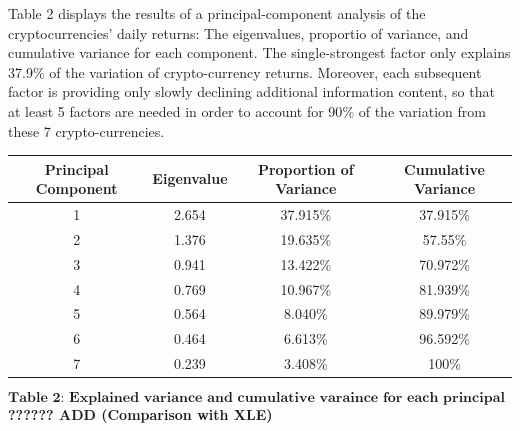\documentclass[12pt,twoside]{article}
\newcommand{\head}[1]{\textnormal{\textbf{#1}}}
\begin{document}
\bigbreak
Table 2 displays the results of a principal-component analysis of the cryptocurrencies’ daily returns: The eigenvalues, proportio of variance, and cumulative variance for each component. The single-strongest factor only explains 37.9$\%$ of the variation of crypto-currency returns. Moreover, each subsequent factor is providing only slowly declining additional information content, so that at least 5 factors are needed in order to account for 90$\%$ of the variation from these 7 crypto-currencies. 
\bigbreak
\begin{tabular}{cccc}
\hline
\head{Principal Component} & \head{Eigenvalue} & \head{Proportion of Variance} & \head{Cumulative Variance}\\
\hline
1 & 2.654 &  37.915\% & 37.915\%\\
2 & 1.376 & 19.635\% & 57.55\%\\
3 & 0.941 &  13.422\% & 70.972\%\\
4 & 0.769 &  10.967\% & 81.939\%\\
5 & 0.564 &  8.040\%  & 89.979\%\\
6 & 0.464 & 6.613\% & 96.592\%\\
7 & 0.239 &  3.408\% & 100\%\\
\hline
\end{tabular}
$$\textbf{Table 2:  Explained variance and cumulative varaince for each principal component}$$
\bigbreak
\textbf{??????
ADD (Comparison with XLE)}
\bigbreak
\end{document}
